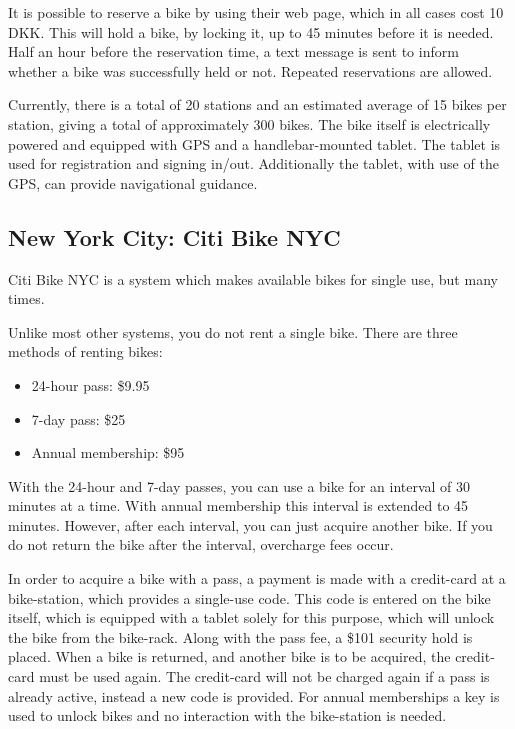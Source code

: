 It is possible to reserve a bike by using their web page, which in all cases cost 10 DKK.
This will hold a bike, by locking it, up to 45 minutes before it is needed.
Half an hour before the reservation time, a text message is sent to inform whether a bike was successfully held or not.
Repeated reservations are allowed.

Currently, there is a total of 20 stations and an estimated average of 15 bikes per station, giving a total of approximately 300 bikes.
The bike itself is electrically powered and equipped with GPS and a handlebar-mounted tablet.
The tablet is used for registration and signing in/out.
Additionally the tablet, with use of the GPS, can provide navigational guidance.

\subsection{New York City: Citi Bike NYC}
Citi Bike NYC\cite{nyc_citibike} is a system which makes available bikes for single use, but many times.

Unlike most other systems, you do not rent a single bike.
There are three methods of renting bikes:

\begin{itemize}
\item 24-hour pass: \$9.95
\item 7-day pass: \$25
\item Annual membership: \$95
\end{itemize}

With the 24-hour and 7-day passes, you can use a bike for an interval of 30 minutes at a time.
With annual membership this interval is extended to 45 minutes.
However, after each interval, you can just acquire another bike.
If you do not return the bike after the interval, overcharge fees occur.

In order to acquire a bike with a pass, a payment is made with a credit-card at a bike-station, which provides a single-use code.
This code is entered on the bike itself, which is equipped with a tablet solely for this purpose, which will unlock the bike from the bike-rack.
Along with the pass fee, a \$101 security hold is placed.
When a bike is returned, and another bike is to be acquired, the credit-card must be used again.
The credit-card will not be charged again if a pass is already active, instead a new code is provided.
For annual memberships a key is used to unlock bikes and no interaction with the bike-station is needed.

